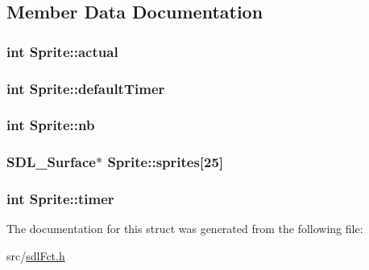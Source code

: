\subsection{Member Data Documentation}
\hypertarget{struct_sprite_aaa3a09f1b82e5fad937e3df6dafd3719}{
\subsubsection[{actual}]{\setlength{\rightskip}{0pt plus 5cm}int Sprite\-::actual}}\label{struct_sprite_aaa3a09f1b82e5fad937e3df6dafd3719}
\hypertarget{struct_sprite_a7ab2c9d62f28c94906cdee3ef441cc29}{
\subsubsection[{default\-Timer}]{\setlength{\rightskip}{0pt plus 5cm}int Sprite\-::default\-Timer}}\label{struct_sprite_a7ab2c9d62f28c94906cdee3ef441cc29}
\hypertarget{struct_sprite_af161aa99ddad84227993c7e115c42f8a}{
\subsubsection[{nb}]{\setlength{\rightskip}{0pt plus 5cm}int Sprite\-::nb}}\label{struct_sprite_af161aa99ddad84227993c7e115c42f8a}
\hypertarget{struct_sprite_ad8469d5efb3c49f4503cdd2e1e0cf84e}{
\subsubsection[{sprites}]{\setlength{\rightskip}{0pt plus 5cm}S\-D\-L\-\_\-\-Surface$\ast$ Sprite\-::sprites\mbox{[}25\mbox{]}}}\label{struct_sprite_ad8469d5efb3c49f4503cdd2e1e0cf84e}
\hypertarget{struct_sprite_a34eca7b18a9dcbad3a2e9c3bfa40f3c8}{
\subsubsection[{timer}]{\setlength{\rightskip}{0pt plus 5cm}int Sprite\-::timer}}\label{struct_sprite_a34eca7b18a9dcbad3a2e9c3bfa40f3c8}


The documentation for this struct was generated from the following file\-:\begin{DoxyCompactItemize}
\item 
src/\hyperlink{sdl_fct_8h}{sdl\-Fct.\-h}\end{DoxyCompactItemize}
